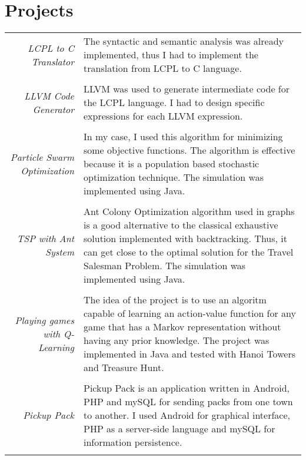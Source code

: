 \documentclass[a4paper,10pt]{article} %
\begin{document}

\section{Projects}
\begin{tabular}{r|p{11cm}}

\emph{LCPL to C Translator}
& \footnotesize{The syntactic and semantic analysis was already implemented, thus I had to implement the translation from LCPL to C language.}\\
\multicolumn{2}{c}{} \\

\emph{LLVM Code Generator}
& \footnotesize{LLVM was used to generate intermediate code for the LCPL language. I had to design specific expressions for each LLVM expression.}\\
\multicolumn{2}{c}{} \\

\emph{Particle Swarm Optimization}
& \footnotesize{In my case, I used this algorithm for minimizing some objective functions. The algorithm is effective because it is a population based stochastic optimization technique. The simulation was implemented using Java.}\\
\multicolumn{2}{c}{} \\

\emph{TSP with Ant System}
& \footnotesize{Ant Colony Optimization algorithm used in graphs is a good alternative to the classical exhaustive solution implemented with backtracking. Thus, it can get close to the optimal solution for the Travel Salesman Problem. The simulation was implemented using Java.}\\
\multicolumn{2}{c}{} \\

\emph{Playing games with Q-Learning}
& \footnotesize{The idea of the project is to use an algoritm capable of learning an action-value function for any game that has a Markov representation without having any prior knowledge. The project was implemented in Java and tested with Hanoi Towers and Treasure Hunt.}\\
\multicolumn{2}{c}{} \\

\emph{Pickup Pack}
& \footnotesize{Pickup Pack is an application written in Android, PHP and mySQL for sending packs from one town to another. I used Android for graphical interface, PHP as a server-side language and mySQL for information persistence.}\\
\multicolumn{2}{c}{} \\


\end{tabular}
\end{document}
